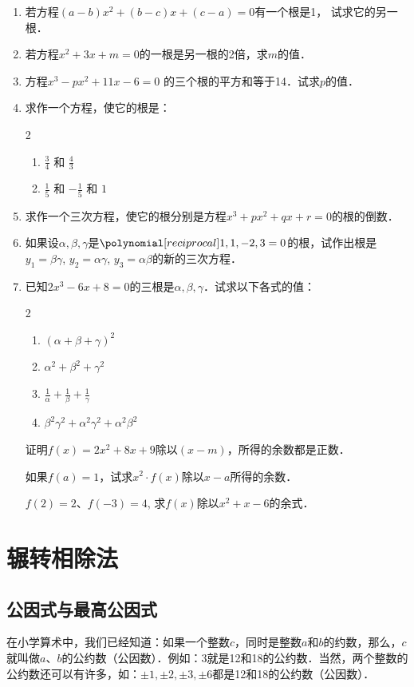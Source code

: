 \begin{enumerate}
\item 若方程$(a-b)x^2+(b-c)x+(c-a)=0$有一个根是1，
试求它的另一根．
\item 若方程$x^2+3x+m=0$的一根是另一根的2倍，求$m$的值．
\item 方程$x^3-px^2+11x-6=0$ 的三个根的平方和等于14．试求$p$的值．
\item 求作一个方程，使它的根是：
\begin{multicols}{2}
    \begin{enumerate}
    \item $\frac{3}{4}$ 和 $\frac{4}{3}$
    \item $\frac{1}{5}$ 和 $-\frac{1}{5}$ 和 $1$
\end{enumerate}
\end{multicols}

\item 求作一个三次方程，使它的根分别是方程$x^3+px^2+qx+r=0$的根的倒数．

\item 如果设$\alpha,\beta,
\gamma$是$\poly{1,1,-2,3}=0$的根，试作出根是
$y_1=\beta\gamma$, $y_2=\alpha\gamma$, $y_3=\alpha\beta$的新的三次方程．

\item 已知$2x^3-6x+8=0$的三根是$\alpha,\beta,
\gamma$．试求以下各式的值：
\begin{multicols}{2}
    \begin{enumerate}
    \item $(\alpha+\beta+\gamma)^2$ 
    \item $\alpha^2+\beta^2+\gamma^2$ 
    \item $\frac{1}{\alpha}+\frac{1}{\beta}+\frac{1}{\gamma}$
    \item $\beta^2\gamma^2+\alpha^2\gamma^2+\alpha^2\beta^2$
\end{enumerate}
\end{multicols}

\staritem 证明$f(x)=2x^2+8x+9$除以$(x-m)$，所得的余数都是正数．

\staritem 如果$f(a)=1$，试求$x^2\cdot f(x)$除以$x-a$所得的余数．

\staritem $f(2)=2$、$f(-3)=4$, 求$f(x)$除以$x^2+x-6$的余式．

\end{enumerate}


\section{辗转相除法}
\subsection{公因式与最高公因式}
在小学算术中，我们已经知道：如果一个整数$c$，同时是整数$a$和$b$的约数，那么，$c$就叫做$a$、$b$的公约数（公因数）．例如：3就是12和18的公约数．当然，两个整数的公约数还可以有许多，如：$\pm 1,\pm 2,\pm 3,\pm 6$都是12和18的公约数（公因数）．

